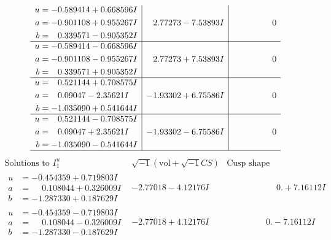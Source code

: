\documentclass[1p]{elsarticle_modified}
\theoremstyle{definition}
\newcommand{\I}{\sqrt{-1}}
\begin{document}
$$\begin{array}{c|c|c}
\begin{aligned}
u &= -0.589414 + 0.668596 I \\
a &= -0.901108 + 0.955267 I \\
b &= \phantom{-}0.339571 - 0.905352 I\end{aligned}
 & \phantom{-}2.77273 - 7.53893 I & \phantom{-0.000000 } 0 \\ \hline\begin{aligned}
u &= -0.589414 - 0.668596 I \\
a &= -0.901108 - 0.955267 I \\
b &= \phantom{-}0.339571 + 0.905352 I\end{aligned}
 & \phantom{-}2.77273 + 7.53893 I & \phantom{-0.000000 } 0 \\ \hline\begin{aligned}
u &= \phantom{-}0.521144 + 0.708575 I \\
a &= \phantom{-}0.09047 - 2.35621 I \\
b &= -1.035090 + 0.541644 I\end{aligned}
 & -1.93302 + 6.75586 I & \phantom{-0.000000 } 0 \\ \hline\begin{aligned}
u &= \phantom{-}0.521144 - 0.708575 I \\
a &= \phantom{-}0.09047 + 2.35621 I \\
b &= -1.035090 - 0.541644 I\end{aligned}
 & -1.93302 - 6.75586 I & \phantom{-0.000000 } 0\\
 \hline 
 \end{array}$$\newpage$$\begin{array}{c|c|c}  
\text{Solutions to }I^u_{1}& \I (\text{vol} + \sqrt{-1}CS) & \text{Cusp shape}\\
 \hline 
\begin{aligned}
u &= -0.454359 + 0.719803 I \\
a &= \phantom{-}0.108044 + 0.326009 I \\
b &= -1.287330 + 0.187629 I\end{aligned}
 & -2.77018 - 4.12176 I & \phantom{-0.000000 -}0. + 7.16112 I \\ \hline\begin{aligned}
u &= -0.454359 - 0.719803 I \\
a &= \phantom{-}0.108044 - 0.326009 I \\
b &= -1.287330 - 0.187629 I\end{aligned}
 & -2.77018 + 4.12176 I & \phantom{-0.000000 } 0. - 7.16112 I \\ \hline\begin{aligned}

\end{aligned}
\end{array}$$
\end{document}
